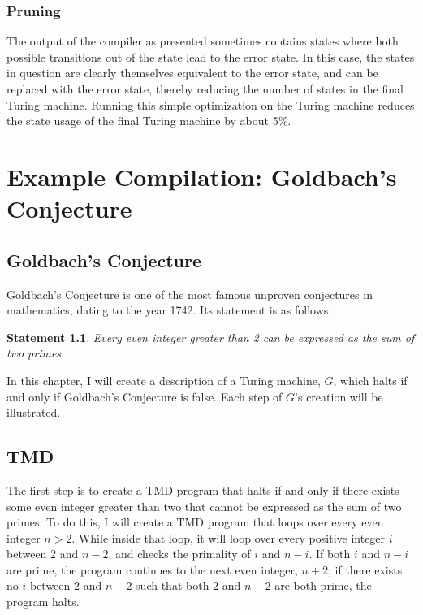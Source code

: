 \documentclass[11pt]{report}
\newtheorem{statement}{Statement}
\begin{document}
\subsection{Pruning}

The output of the compiler as presented sometimes contains states where both possible transitions out of the state lead to the error state. In this case, the states in question are clearly themselves equivalent to the error state, and can be replaced with the error state, thereby reducing the number of states in the final Turing machine. Running this simple optimization on the Turing machine reduces the state usage of the final Turing machine by about 5\%.



\chapter{Example Compilation: Goldbach's Conjecture}

\section{Goldbach's Conjecture}

Goldbach's Conjecture is one of the most famous unproven conjectures in mathematics, dating to the year 1742. Its statement is as follows: \\

\begin{statement}
\emph{Every even integer greater than 2 can be expressed as the sum of two primes.}
\label{goldbachstatement}
\end{statement}

In this chapter, I will create a description of a Turing machine, $G$, which halts if and only if Goldbach's Conjecture is false. Each step of $G$'s creation will be illustrated.

\section{TMD \label{sec:tmdgoldbach}}

The first step is to create a TMD program that halts if and only if there exists some even integer greater than two that cannot be expressed as the sum of two primes. To do this, I will create a TMD program that loops over every even integer $n > 2$. While inside that loop, it will loop over every positive integer $i$ between $2$ and $n-2$, and checks the primality of $i$ and $n-i$. If both $i$ and $n-i$ are prime, the program continues to the next even integer, $n+2$; if there exists no $i$ between $2$ and $n-2$ such that both $2$ and $n-2$ are both prime, the program halts. %
\end{document}
